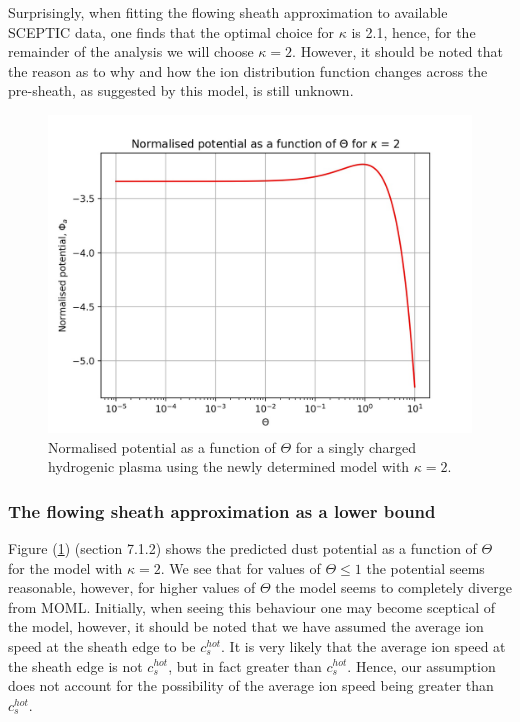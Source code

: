 \documentclass{article}
\begin{document}
\medskip 

Surprisingly, when fitting the flowing sheath approximation to available SCEPTIC data, one finds that
the optimal choice for $\kappa$ is 2.1, hence, for the remainder of the analysis we will choose $\kappa = 2$. However, it should be noted that the reason as to why and how 
the ion distribution function changes across the pre-sheath, as suggested by this model, is still unknown.

\begin{figure}[H]
\centering
\includegraphics[width=\linewidth]{Output/FSpotential.jpeg}
\caption{Normalised potential as a function of $\Theta$ for a singly charged hydrogenic plasma
using the newly determined model with $\kappa = 2$.}
\label{FSpotential} 
\end{figure}

\subsubsection{The flowing sheath approximation as a lower bound}
\medskip

Figure (\ref{FSpotential}) (section 7.1.2) shows the predicted dust potential as a function of $\Theta$ for 
the model with $\kappa = 2$. We see that for values of $\Theta \leq 1$ the potential seems reasonable, however, for higher
values of $\Theta$ the model seems to completely diverge from MOML. Initially, when seeing this behaviour 
one may become sceptical of the model, however, it should be noted that we have assumed the average ion speed at
the sheath edge to be $c_s^{hot}$. It is very likely that the average ion
speed at the sheath edge is not $c_s^{hot}$, but in fact greater than $c_s^{hot}$. Hence, our assumption does not account for the possibility of the average ion 
speed being greater than $c_s^{hot}$. 
\end{document}
